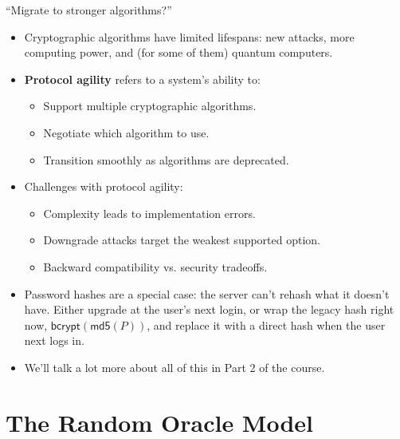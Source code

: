 \ifdefined\PRESENTATION\else\PassOptionsToClass{handout}{beamer}\fi\documentclass[aspectratio=169, lualatex]{beamer}
\begin{document}
\begin{frame}{``Migrate to stronger algorithms?''}
	\begin{itemize}
		\item Cryptographic algorithms have limited lifespans: new attacks, more computing power, and (for some of them) quantum computers.
		\item \textbf{Protocol agility} refers to a system's ability to:
		      \begin{itemize}
			      \item Support multiple cryptographic algorithms.
			      \item Negotiate which algorithm to use.
			      \item Transition smoothly as algorithms are deprecated.
		      \end{itemize}
		\item Challenges with protocol agility:
		      \begin{itemize}
			      \item Complexity leads to implementation errors.
			      \item Downgrade attacks target the weakest supported option.
			      \item Backward compatibility vs. security tradeoffs.
		      \end{itemize}
		\item Password hashes are a special case: the server can't rehash what it doesn't have. Either upgrade at the user's next login, or wrap the legacy hash right now, $\mathsf{bcrypt}(\mathsf{md5}(P))$, and replace it with a direct hash when the user next logs in.
		\item We'll talk a lot more about all of this in Part 2 of the course.
	\end{itemize}
\end{frame}

\section{The Random Oracle Model}
\end{document}
